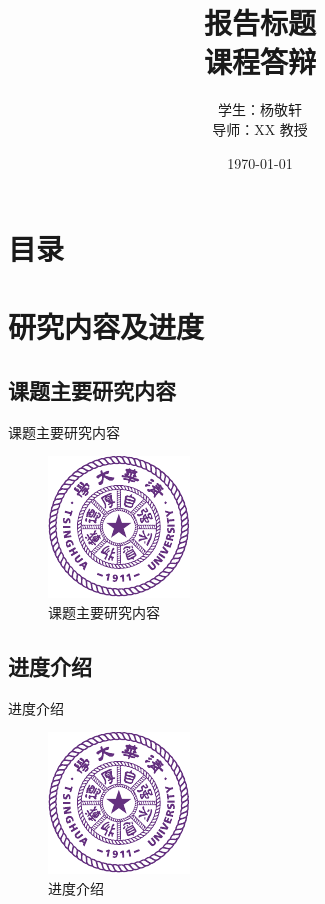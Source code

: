 \documentclass{beamer}
\title[报告标题]{报告标题\\[2mm] 课程答辩}
\author[杨敬轩]{学生：杨敬轩\\[5mm] 导师：XX 教授}
\institute[清华大学]{\small  清华大学}
\date{\small \vskip -10pt \today}
\begin{document}
\begin{frame}
	\maketitle
\end{frame}

\section*{目录}
\frame{
  \frametitle{\secname}
  \tableofcontents[hideallsubsections]
}

\section{研究内容及进度}

\subsection{课题主要研究内容}

\begin{frame}{课题主要研究内容}
  \begin{figure}
    \includegraphics[width=0.4\linewidth]{thulogo}
    \caption{课题主要研究内容}
  \end{figure}
\end{frame}

\subsection{进度介绍}

\begin{frame}{进度介绍}
  \begin{figure}
    \includegraphics[width=0.4\linewidth]{thulogo}
    \caption{进度介绍}
  \end{figure}
\end{frame}
\end{document}
